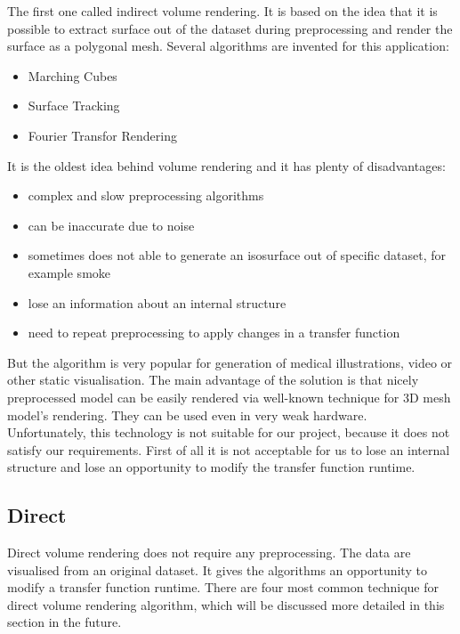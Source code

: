 \documentclass[twoside, english, 11pt]{report}
\begin{document}
The first one called indirect volume rendering. It is based on the idea that it is possible to extract surface out of the dataset during preprocessing and render the surface as a polygonal mesh. Several algorithms are invented for this application:
\begin{itemize}
\item Marching Cubes
\item Surface Tracking
\item Fourier Transfor Rendering
\end{itemize}
It is the oldest idea behind volume rendering and it has plenty of disadvantages:
\begin{itemize}
\item complex and slow preprocessing algorithms
\item can be inaccurate due to noise
\item sometimes does not able to generate an isosurface out of specific dataset, for example smoke
\item lose an information about an internal structure
\item need to repeat preprocessing to apply changes in a transfer function
\end{itemize}

But the algorithm is very popular for generation of medical illustrations, video or other static visualisation. The main advantage of the solution is that nicely preprocessed model can be easily rendered via well-known technique for 3D mesh model's rendering. They can be used even in very weak hardware.\\

Unfortunately, this technology is not suitable for our project, because it does not satisfy our requirements. First of all it is not acceptable for us to lose an internal structure and lose an opportunity to modify the transfer function runtime.

\subsection{Direct}
Direct volume rendering does not require any preprocessing. The data are visualised from an original dataset. It gives the algorithms an opportunity to modify a transfer function runtime. There are four most common technique for direct volume rendering algorithm, which will be discussed more detailed in this section in the future.\\
\end{document}
